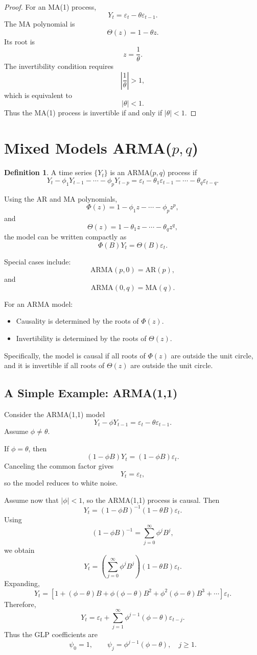 \documentclass[12pt,oneside]{book}
\numberwithin{equation}{section}
\theoremstyle{definition}
\newtheorem{definition}{Definition}[section]
\theoremstyle{plain}
\theoremstyle{remark}
\begin{document}
\begin{proof}
For an MA(1) process,
\[
Y_t=\varepsilon_t-\theta\varepsilon_{t-1}.
\]
The MA polynomial is
\[
\Theta(z)=1-\theta z.
\]
Its root is
\[
z=\frac{1}{\theta}.
\]
The invertibility condition requires
\[
\left|\frac{1}{\theta}\right|>1,
\]
which is equivalent to
\[
|\theta|<1.
\]
Thus the MA(1) process is invertible if and only if $|\theta|<1$.
\end{proof}

\section{Mixed Models ARMA($p,q$)}

\begin{definition}
A time series $\{Y_t\}$ is an ARMA($p,q$) process if
\[
Y_t-\phi_1Y_{t-1}-\cdots-\phi_pY_{t-p}
=
\varepsilon_t-\theta_1\varepsilon_{t-1}-\cdots-\theta_q\varepsilon_{t-q}.
\]
\end{definition}

Using the AR and MA polynomials,
\[
\Phi(z)=1-\phi_1z-\cdots-\phi_pz^p,
\]
and
\[
\Theta(z)=1-\theta_1z-\cdots-\theta_qz^q,
\]
the model can be written compactly as
\[
\Phi(B)Y_t=\Theta(B)\varepsilon_t.
\]

Special cases include:
\[
\mathrm{ARMA}(p,0)=\mathrm{AR}(p),
\]
and
\[
\mathrm{ARMA}(0,q)=\mathrm{MA}(q).
\]

For an ARMA model:
\begin{itemize}
\item Causality is determined by the roots of $\Phi(z)$.
\item Invertibility is determined by the roots of $\Theta(z)$.
\end{itemize}
Specifically, the model is causal if all roots of $\Phi(z)$ are outside the unit circle, and it is invertible if all roots of $\Theta(z)$ are outside the unit circle.

\subsection*{A Simple Example: ARMA(1,1)}

Consider the ARMA(1,1) model
\[
Y_t-\phi Y_{t-1}
=
\varepsilon_t-\theta\varepsilon_{t-1}.
\]
Assume $\phi\neq\theta$.

If $\phi=\theta$, then
\[
(1-\phi B)Y_t=(1-\phi B)\varepsilon_t.
\]
Canceling the common factor gives
\[
Y_t=\varepsilon_t,
\]
so the model reduces to white noise.

Assume now that $|\phi|<1$, so the ARMA(1,1) process is causal. Then
\[
Y_t
=
(1-\phi B)^{-1}(1-\theta B)\varepsilon_t.
\]
Using
\[
(1-\phi B)^{-1}
=
\sum_{j=0}^{\infty}\phi^jB^j,
\]
we obtain
\[
Y_t
=
\left(\sum_{j=0}^{\infty}\phi^jB^j\right)(1-\theta B)\varepsilon_t.
\]
Expanding,
\[
Y_t
=
\left[
1+(\phi-\theta)B+\phi(\phi-\theta)B^2+\phi^2(\phi-\theta)B^3+\cdots
\right]\varepsilon_t.
\]
Therefore,
\[
Y_t
=
\varepsilon_t+\sum_{j=1}^{\infty}\phi^{j-1}(\phi-\theta)\varepsilon_{t-j}.
\]
Thus the GLP coefficients are
\[
\psi_0=1,
\qquad
\psi_j=\phi^{j-1}(\phi-\theta),
\quad j\geq 1.
\]
\end{document}
